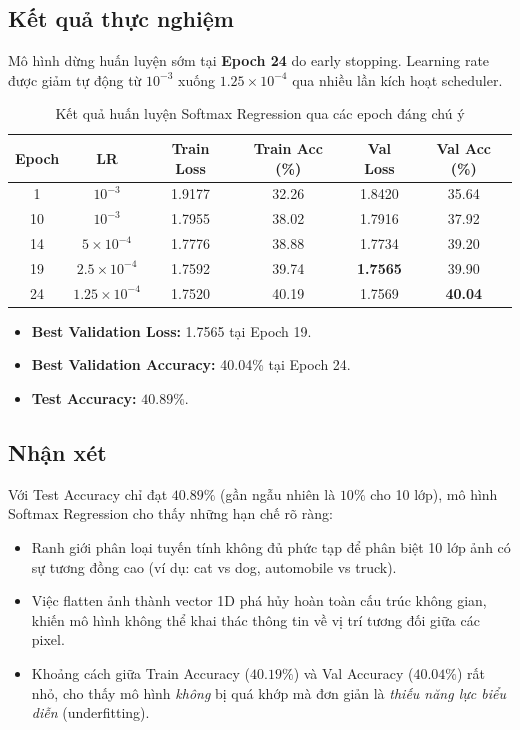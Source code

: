 \documentclass[a4paper]{article}
\theoremstyle{definition}
\begin{document}
\subsection{Kết quả thực nghiệm}

Mô hình dừng huấn luyện sớm tại \textbf{Epoch 24} do early stopping. Learning rate được giảm tự động từ $10^{-3}$ xuống $1.25 \times 10^{-4}$ qua nhiều lần kích hoạt scheduler.

\begin{table}[H]
	\centering
	\caption{Kết quả huấn luyện Softmax Regression qua các epoch đáng chú ý}
	\footnotesize
	\begin{tabular}{|c|c|c|c|c|c|}
		\hline
		\textbf{Epoch} & \textbf{LR} & \textbf{Train Loss} & \textbf{Train Acc (\%)} & \textbf{Val Loss} & \textbf{Val Acc (\%)} \\ \hline
		1   & $10^{-3}$          & 1.9177 & 32.26 & 1.8420 & 35.64 \\ \hline
		10  & $10^{-3}$          & 1.7955 & 38.02 & 1.7916 & 37.92 \\ \hline
		14  & $5 \times 10^{-4}$ & 1.7776 & 38.88 & 1.7734 & 39.20 \\ \hline
		19  & $2.5 \times 10^{-4}$ & 1.7592 & 39.74 & \textbf{1.7565} & 39.90 \\ \hline
		24  & $1.25 \times 10^{-4}$ & 1.7520 & 40.19 & 1.7569 & \textbf{40.04} \\ \hline
	\end{tabular}
	\label{tab:softmax-results}
\end{table}

\begin{itemize}
	\item \textbf{Best Validation Loss:} 1.7565 tại Epoch 19.
	\item \textbf{Best Validation Accuracy:} 40.04\% tại Epoch 24.
	\item \textbf{Test Accuracy:} $\mathbf{40.89\%}$.
\end{itemize}

\subsection{Nhận xét}
Với Test Accuracy chỉ đạt $40.89\%$ (gần ngẫu nhiên là $10\%$ cho 10 lớp), mô hình Softmax Regression cho thấy những hạn chế rõ ràng:
\begin{itemize}
	\item Ranh giới phân loại tuyến tính không đủ phức tạp để phân biệt 10 lớp ảnh có sự tương đồng cao (ví dụ: cat vs dog, automobile vs truck).
	\item Việc flatten ảnh thành vector 1D phá hủy hoàn toàn cấu trúc không gian, khiến mô hình không thể khai thác thông tin về vị trí tương đối giữa các pixel.
	\item Khoảng cách giữa Train Accuracy ($40.19\%$) và Val Accuracy ($40.04\%$) rất nhỏ, cho thấy mô hình \textit{không} bị quá khớp mà đơn giản là \textit{thiếu năng lực biểu diễn} (underfitting).
\end{itemize}
\end{document}
